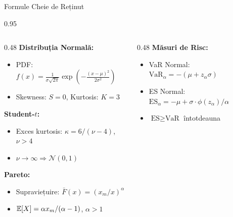 \documentclass[9pt, aspectratio=169, t]{beamer}
\begin{document}
\begin{frame}{Formule Cheie de Reținut}
\begin{cminipage}{0.95\textwidth}
    \begin{columns}[T]
        \begin{column}{0.48\textwidth}
            \textbf{Distribuția Normală:}
            \begin{itemize}\setlength{\itemsep}{0pt}
                \item PDF: $f(x) = \frac{1}{\sigma\sqrt{2\pi}}\exp\!\left(-\frac{(x-\mu)^2}{2\sigma^2}\right)$
                \item Skewness: $S = 0$, Kurtosis: $K = 3$
            \end{itemize}

            \vspace{0.3cm}

            \textbf{Student-$t$:}
            \begin{itemize}\setlength{\itemsep}{0pt}
                \item Exces kurtosis: $\kappa = 6/(\nu - 4)$, $\nu > 4$
                \item $\nu \to \infty \Rightarrow \mathcal{N}(0,1)$
            \end{itemize}

            \vspace{0.3cm}

            \textbf{Pareto:}
            \begin{itemize}\setlength{\itemsep}{0pt}
                \item Supraviețuire: $\bar{F}(x) = (x_m/x)^\alpha$
                \item $\mathbb{E}[X] = \alpha x_m/(\alpha - 1)$, $\alpha > 1$
            \end{itemize}
        \end{column}
        \begin{column}{0.48\textwidth}
            \textbf{Măsuri de Risc:}
            \begin{itemize}\setlength{\itemsep}{0pt}
                \item VaR Normal: $\text{VaR}_\alpha = -(\mu + z_\alpha \sigma)$
                \item ES Normal: $\text{ES}_\alpha = -\mu + \sigma \cdot \phi(z_\alpha)/\alpha$
                \item $\text{ES} \geq \text{VaR}$ întotdeauna
            \end{itemize}

            \vspace{0.3cm}


\end{column}
\end{columns}
\end{cminipage}
\end{frame}
\end{document}
